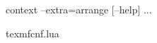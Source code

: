 \stopsubject

\startsubject[title=These are run like]

    \starttyping
    context --extra=arrange [--help] ...
    \stoptyping \FlushStep

\stopsubject

\StopSteps

\page

\StartSteps

\startsubject[title=Local preferences]

    \starttyping
    texmfcnf.lua
    \stoptyping \FlushStep

\stopsubject

\StopSteps

\stopdocument

